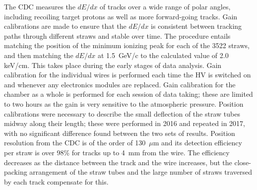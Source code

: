 The CDC measures the $dE/dx$ of tracks over a wide range of polar angles, including recoiling target protons as well as more forward-going tracks. Gain calibrations are made to ensure that the $dE/dx$ is consistent between tracking paths through different straws and stable over time. 
The procedure entails matching the position of the minimum ionizing peak for each of the 3522 straws, and then matching the $dE/dx$ at 1.5~GeV/c to the calculated value of 2.0~ keV/cm. This takes place during the early stages of data analysis. Gain calibration for the individual wires is performed each time the HV is switched on and whenever any electronics modules are replaced. Gain calibration for the chamber as a whole is performed for each session of data taking; these are limited to two hours as the gain is very sensitive to the atmospheric pressure. Position calibrations were necessary to describe the small deflection of the straw tubes midway along their length; these were performed in 2016 and repeated in 2017, with no significant difference found between the two sets of results.  Position resolution from the CDC is of the order of 130~$\mu$m and its detection efficiency per straw is over 98\% for tracks up to 4~mm from the wire. The efficiency decreases as the distance between the track and the wire increases, but the close-packing arrangement of the straw tubes and the large number of straws traversed by each track compensate for this. 

